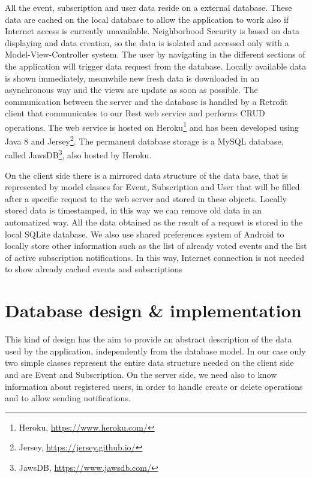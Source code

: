 \documentclass[a4paper]{scrreprt}
\begin{document}
\bigskip All the event, subscription and user data reside on a external database. These data are cached on the local database to allow the application to work also if Internet access is currently unavailable. Neighborhood Security is based on data displaying and data creation, so the data is isolated and accessed only with a Model-View-Controller system. The user by navigating in the different sections of the application will trigger data request from the database. Locally available data is shown immediately, meanwhile new fresh data is downloaded in an asynchronous way and the views are update as soon as possible. The communication between the server and the database is handled by a Retrofit client that communicates to our Rest web service and performs CRUD operations. The web service is hosted on Heroku\footnote{Heroku, \url{https://www.heroku.com/}} and has been developed using Java 8 and Jersey\footnote{Jersey, \url{https://jersey.github.io/}}. The permanent database storage is a MySQL database, called JawsDB\footnote{JawsDB, \url{https://www.jawsdb.com/}}, also hosted by Heroku.

On the client side there is a mirrored data structure of the data base, that is represented by model classes for Event, Subscription and User that will be filled after a specific request to the web server and stored in these objects. Locally stored data is timestamped, in this way we can remove old data in an automatized way. All the data obtained as the result of a request is stored in the local SQLite database. We also use shared preferences system of Android to locally store other information such as the list of already voted events and the list of active subscription notifications. In this way, Internet connection is not needed to show already cached events and subscriptions

\section{Database design \& implementation}
This kind of design has the aim to provide an abstract description of the data used by the application, independently from the database model. In our case only two simple classes represent the entire data structure needed on the client side and are Event and Subscription. On the server side, we need also to know information about registered users, in order to handle create or delete operations and to allow sending notifications.
\end{document}
